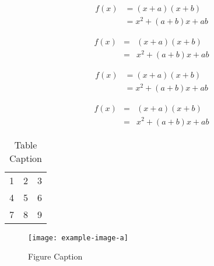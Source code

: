 \begin{align}
 f(x) &= (x+a)(x+b) \\
      &= x^2 + (a+b)x + ab
\end{align}

\begin{eqnarray}
 f(x) &=& (x+a)(x+b) \nonumber\\ %
      &=& x^2 + (a+b)x + ab
\end{eqnarray}

\begin{align*}
 f(x) &= (x+a)(x+b) \\
      &= x^2 + (a+b)x + ab
\end{align*}

\begin{eqnarray*}
 f(x)&=& (x+a)(x+b) \\
     &=& x^2 + (a+b)x + ab
\end{eqnarray*}


\begin{table}[t]%
  \centering%
  \begin{tabular}{l c r}%
    1 & 2 & 3 \\ %
    4 & 5 & 6 \\
    7 & 8 & 9 \\
  \end{tabular}
  \caption{Table Caption}\label{tab1}
\end{table}


\begin{figure}[t]%
  \centering%
  \texttt{[image: example-image-a]}
  \caption{Figure Caption}\label{fig1}
\end{figure}
